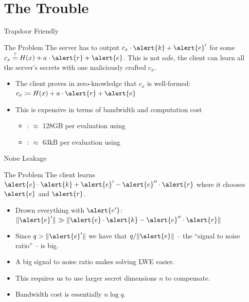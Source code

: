 \documentclass[xcolor=table,10pt,aspectratio=169]{beamer}
\begin{document}
\section{The Trouble}
\label{sec:orgb5c062b}
\begin{frame}[label={sec:org68aef1e}]{Trapdoor Friendly}
\begin{alertblock}{The Problem}
The server has to output \(c_{x} \cdot \alert{k} + \alert{e}'\) for some \(c_x \overset{?}{=}  H(x) + a \cdot \alert{r} + \alert{e}\). This is not safe, the client can learn all the server's secrets with one maliciously crafted \(c_{x}\).
\end{alertblock}
\begin{itemize}
\item The client proves in zero-knowledge that \(c_{x}\) is well-formed: \(c_{x} \coloneqq H(x) + a \cdot \alert{r} + \alert{e}\)
\item This is expensive in terms of bandwidth and computation cost
\begin{itemize}
\item \cite{PKC:ADDS21}: \(\approx\) 128GB per evaluation using \cite{C:YAZXYW19}
\item \cite{AC:AlbGur24}: \(\approx\) 63kB per evaluation using \cite{C:BeuSei23}
\end{itemize}
\end{itemize}
\end{frame}
\begin{frame}[label={sec:org7e14751}]{Noise Leakage}
\begin{alertblock}{The Problem}
The client learns \(\alert{e}\cdot\alert{k} + \alert{e}'  - \alert{e}'' \cdot \alert{r}\)
where it chooses \(\alert{e}\) and \(\alert{r}\). 
\end{alertblock}
\begin{itemize}
\item Drown everything with \(\alert{e'}\): \(\Vert\alert{e}'\Vert \gg  \Vert\alert{e}\cdot\alert{k}  - \alert{e}'' \cdot \alert{r}\Vert\)
\item Since \(q > \Vert\alert{e}'\Vert\) we have that \(q/\Vert \alert{e} \Vert\) -- the ``signal to noise ratio'' -- is big.
\item A big signal to noise ratio makes solving LWE easier.
\item This requires us to use larger secret dimensions \(n\) to compensate.
\item Bandwidth cost is essentially \(n \log q\).
\end{itemize}
\end{frame}
\end{document}
